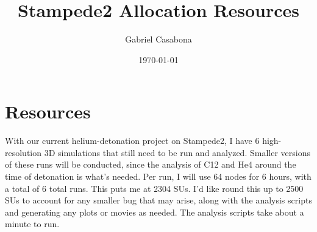 \documentclass[11pt]{article}
\title{ Stampede2 Allocation Resources}
\author{ Gabriel Casabona }
\date{\today}
\begin{document}
\maketitle	



\section{Resources}

With our current helium-detonation project on Stampede2, I have 6 high-resolution 3D simulations that still need to be run and analyzed. Smaller versions of these runs will be conducted, since the analysis of C12 and He4 around the time of detonation is what's needed. Per run, I will use 64 nodes for 6 hours, with a total of 6 total runs. This puts me at 2304 SUs. I'd like round this up to 2500 SUs to account for any smaller bug that may arise, along with the analysis scripts and generating any plots or movies as needed. The analysis scripts take about a minute to run.




\end{document}
